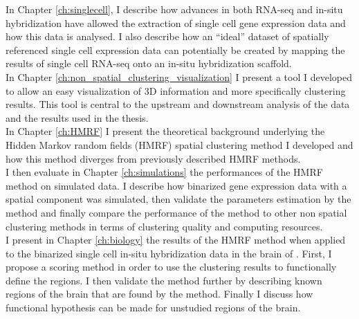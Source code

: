 	In Chapter \ref{ch:singlecell}, I describe how advances in both RNA-seq and in-situ hybridization have allowed the extraction of single cell gene expression data and how this data is analysed. I also describe how an ``ideal'' dataset of spatially referenced single cell expression data can potentially be created by mapping the results of single cell RNA-seq onto an in-situ hybridization scaffold.\\
	
	In Chapter \ref{ch:non_spatial_clustering_visualization} I present a tool I developed to allow an easy visualization of 3D information and more specifically clustering results. This tool is central to the upstream and downstream analysis of the data and the results used in the thesis.\\
	
	In Chapter \ref{ch:HMRF} I  present the theoretical background underlying the Hidden Markov random fields (HMRF) spatial clustering method I developed and how this method diverges from previously described HMRF methods. \\
	
	I then evaluate in Chapter \ref{ch:simulations} the performances of the HMRF method on simulated data. I describe how binarized gene expression data with a spatial component was simulated, then validate the parameters estimation by the method and finally compare the performance of the method to other non spatial clustering methods in terms of clustering quality and computing resources.\\
	
	I present in Chapter \ref{ch:biology} the results of the HMRF method when applied to the binarized single cell in-situ hybridization data in the brain of \platyfull{}. First, I propose a scoring method in order to use the clustering results to functionally define the regions. I then validate the method further by describing known regions of the brain that are found by the method. Finally I discuss how functional hypothesis can be made for unstudied regions of the brain.
	
	
	

%
%
%
%
%



